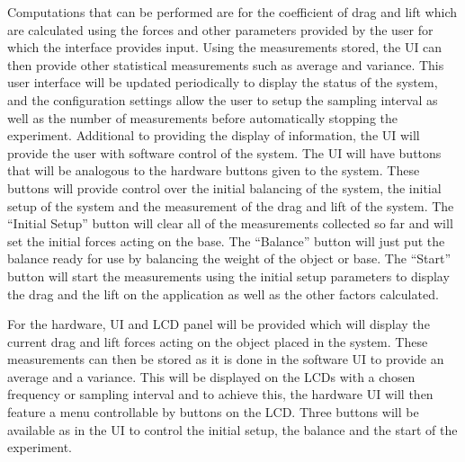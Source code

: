 		Computations that can be performed are for the coefficient of drag and lift which are calculated using the forces and other parameters provided by the user for which the interface provides input. Using the measurements stored, the UI can then provide other statistical measurements such as average and variance. This user interface will be updated periodically to display the status of the system, and the configuration settings allow the user to setup the sampling interval as well as the number of measurements before automatically stopping the experiment. Additional to providing the display of information, the UI will provide the user with software control of the system. The UI will have buttons that will be analogous to the hardware buttons given to the system. These buttons will provide control over the initial balancing of the system, the initial setup of the system and the measurement of the drag and lift of the system. The “Initial Setup” button will clear all of the measurements collected so far and will set the initial forces acting on the base. The “Balance” button will just put the balance ready for use by balancing the weight of the object or base. The “Start” button will start the measurements using the initial setup parameters to display the drag and the lift on the application as well as the other factors calculated.

		For the hardware, UI and LCD panel will be provided which will display the current drag and lift forces acting on the object placed in the system. These measurements can then be stored as it is done in the software UI to provide an average and a variance. This will be displayed on the LCDs with a chosen frequency or sampling interval and to achieve this, the hardware UI will then feature a menu controllable by buttons on the LCD. Three buttons will be available as in the UI to control the initial setup, the balance and the start of the experiment.